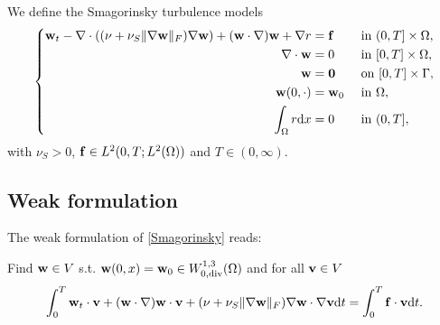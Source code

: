 \documentclass[oneside,11pt]{book}
\numberwithin{equation}{section}
\begin{document}
We define the Smagorinsky turbulence models
\begin{equation}
    \label{Smagorinsky}
    \left\{\begin{split}
        {\bf w}_t - \nabla\cdot((\nu + \nu_S\|\nabla{\bf w}\|_F)\nabla{\bf w}) + ({\bf w}\cdot\nabla){\bf w} + \nabla r &= {\bf f} &&\mbox{ in } (0,T]\times\Omega,\\
        \nabla\cdot{\bf w} &= 0 &&\mbox{ in } [0,T]\times\Omega,\\
        {\bf w} &= {\bf 0} &&\mbox{ on } [0,T]\times\Gamma,\\
        {\bf w}(0,\cdot) &= {\bf w}_0 &&\mbox{ in } \Omega,\\
        \int_\Omega r{\rm d}x &= 0 &&\mbox{ in } (0,T],
    \end{split}\right.
\end{equation}
with $\nu_S > 0$, ${\bf f}\in L^2(0,T;L^2(\Omega))$ and $T\in(0,\infty)$.

\subsection{Weak formulation}
The weak formulation of \eqref{Smagorinsky} reads:

Find ${\bf w}\in V$ s.t. ${\bf w}(0,x) = {\bf w}_0\in W_{0,{\rm div}}^{1,3}(\Omega)$ and for all ${\bf v}\in V$
\begin{align}
    \label{weak formulation Smagorinksy}
    \int_0^T {\bf w}_t\cdot{\bf v} + ({\bf w}\cdot\nabla){\bf w}\cdot{\bf v} + (\nu + \nu_S\|\nabla{\bf w}\|_F)\nabla{\bf w}\cdot\nabla{\bf v}{\rm d}t = \int_0^T {\bf f}\cdot{\bf v}{\rm d}t.
\end{align}
\end{document}
